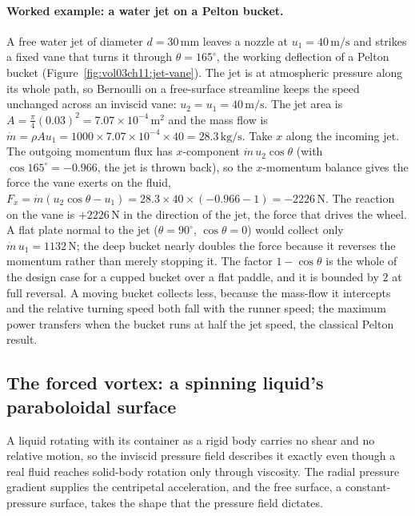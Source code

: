 \paragraph{Worked example: a water jet on a Pelton bucket.} A free
water jet of diameter $d = 30\,\si{\milli\meter}$ leaves a nozzle at
$u_1 = 40\,\si{\meter\per\second}$ and strikes a fixed vane that turns
it through $\theta = 165^\circ$, the working deflection of a Pelton
bucket (Figure~\ref{fig:vol03ch11:jet-vane}). The jet is at
atmospheric pressure along its whole path, so Bernoulli on a
free-surface streamline keeps the speed unchanged across an inviscid
vane: $u_2 = u_1 = 40\,\si{\meter\per\second}$. The jet area is $A =
\tfrac{\pi}{4}(0.03)^2 = 7.07\times 10^{-4}\,\si{\meter}^2$ and the
mass flow is $\dot m = \rho A u_1 = 1000\times 7.07\times 10^{-4}\times
40 = 28.3\,\si{\kilogram\per\second}$. Take $x$ along the incoming
jet. The outgoing momentum flux has $x$-component $\dot m\,u_2\cos
\theta$ (with $\cos 165^\circ = -0.966$, the jet is thrown back), so
the $x$-momentum balance gives the force the vane exerts on the fluid,
$F_x = \dot m(u_2\cos\theta - u_1) = 28.3\times 40\times(-0.966 - 1) =
-2226\,\si{\newton}$. The reaction on the vane is $+2226\,\si{\newton}$
in the direction of the jet, the force that drives the wheel. A flat
plate normal to the jet ($\theta = 90^\circ$, $\cos\theta = 0$) would
collect only $\dot m\,u_1 = 1132\,\si{\newton}$; the deep bucket nearly
doubles the force because it reverses the momentum rather than merely
stopping it. The factor $1 - \cos\theta$ is the whole of the design
case for a cupped bucket over a flat paddle, and it is bounded by
$2$ at full reversal. A moving bucket collects less, because the
mass-flow it intercepts and the relative turning speed both fall with
the runner speed; the maximum power transfers when the bucket runs at
half the jet speed, the classical Pelton result.

\subsection{The forced vortex: a spinning liquid's paraboloidal surface}

A liquid rotating with its container as a rigid body carries no shear
and no relative motion, so the inviscid pressure field describes it
exactly even though a real fluid reaches solid-body rotation only
through viscosity. The radial pressure gradient supplies the
centripetal acceleration, and the free surface, a constant-pressure
surface, takes the shape that the pressure field dictates.

